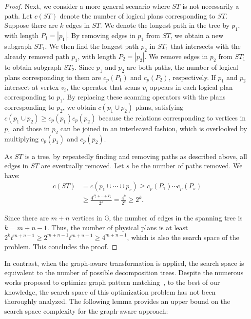 {\begin{proof}
    Next, we consider a more general scenario where $ST$ is not necessarily a path. Let $c(ST)$ denote the number of logical plans corresponding to $ST$. Suppose there are $k$ edges in $ST$. We denote the longest path in the tree by $p_1$, with length $P_1 = |p_1|$. By removing edges in $p_1$ from $ST$, we obtain a new subgraph $ST_1$. We then find the longest path $p_2$ in $ST_1$ that intersects with the already removed path $p_1$, with length $P_2 = |p_2|$. We remove edges in $p_2$ from $ST_1$ to obtain subgraph $ST_2$. Since $p_1$ and $p_2$ are both paths, the number of logical plans corresponding to them are $c_p(P_1)$ and $c_p(P_2)$, respectively. If $p_1$ and $p_2$ intersect at vertex $v_i$, the operator that scans $v_i$ appears in each logical plan corresponding to $p_1$. By replacing these scanning operators with the plans corresponding to $p_2$, we obtain $c(p_1 \cup p_2)$ plans, satisfying $c(p_1 \cup p_2) \geq c_p(p_1)c_p(p_2)$ because the relations corresponding to vertices in $p_1$ and those in $p_2$ can be joined in an interleaved fashion, which is overlooked by multiplying $c_p(p_1)$ and $c_p(p_2)$.

    As $ST$ is a tree, by repeatedly finding and removing paths as described above, all edges in $ST$ are eventually removed. Let $s$ be the number of paths removed. We have:
    \begin{equation*}
    \begin{split}
        c(ST) & = c(p_1 \cup \cdots \cup p_s) \geq c_p(P_1) \cdots c_p(P_s) \\
        & \geq \frac{4^{P_1 + \cdots + P_s}}{2^s} = \frac{4^{k}}{2^s} \geq 2^{k}.
    \end{split}
    \end{equation*}

    Since there are $m + n$ vertices in $\mathbb{G}$, the number of edges in the spanning tree is $k = m + n - 1$. Thus, the number of physical plans is at least $2^{k}t^{m+n-1} \geq 2^{m+n-1}t^{m+n-1} \geq 4^{m+n-1}$, which is also the search space of the problem. This concludes the proof.
\end{proof}


In contrast, when the graph-aware transformation is applied, the search space is equivalent to the number of possible decomposition trees. Despite the numerous works proposed to optimize graph pattern matching~\cite{huge,GLogS,mhedhbi2019optimizing}, to the best of our knowledge, the search space of this optimization problem has not been thoroughly analyzed. The following lemma provides an upper bound on the search space complexity for the graph-aware approach:


}
